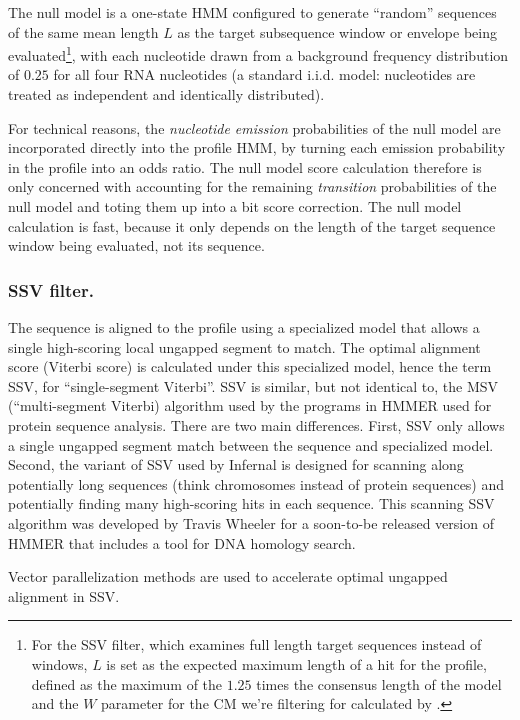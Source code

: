 The null model is a one-state HMM configured to generate ``random''
sequences of the same mean length $L$ as the target subsequence window
or envelope being evaluated\footnote{For the SSV filter, which
examines full length target sequences instead of windows, $L$ is set
as the expected maximum length of a hit for the profile, defined as
the maximum of the $1.25$ times the consensus length of the model and
the $W$ parameter for the CM we're filtering for calculated by
.}, with each nucleotide drawn from a background
frequency distribution of $0.25$ for all four RNA nucleotides (a
standard i.i.d. model: nucleotides are treated as independent and
identically distributed).

For technical reasons, the \emph{nucleotide emission} probabilities of
the null model are incorporated directly into the profile HMM, by
turning each emission probability in the profile into an odds
ratio. The null model score calculation therefore is only concerned
with accounting for the remaining \emph{transition} probabilities of
the null model and toting them up into a bit score correction.  The
null model calculation is fast, because it only depends on the length
of the target sequence window being evaluated, not its sequence.

\subsubsection{SSV filter.}

The sequence is aligned to the profile using a specialized model that
allows a single high-scoring local ungapped segment to match.  The
optimal alignment score (Viterbi score) is calculated under this
specialized model, hence the term SSV, for ``single-segment
Viterbi''. SSV is similar, but not identical to, the MSV
(``multi-segment Viterbi) algorithm used by the programs in HMMER used
for protein sequence analysis. There are two main differences. First,
SSV only allows a single ungapped segment match between the sequence
and specialized model. Second, the variant of SSV used by Infernal is
designed for scanning along potentially long sequences (think
chromosomes instead of protein sequences) and potentially finding many
high-scoring hits in each sequence. This scanning SSV algorithm was
developed by Travis Wheeler for a soon-to-be released version of HMMER
that includes a tool for DNA homology search.

Vector parallelization methods are used to accelerate optimal ungapped
alignment in SSV.

